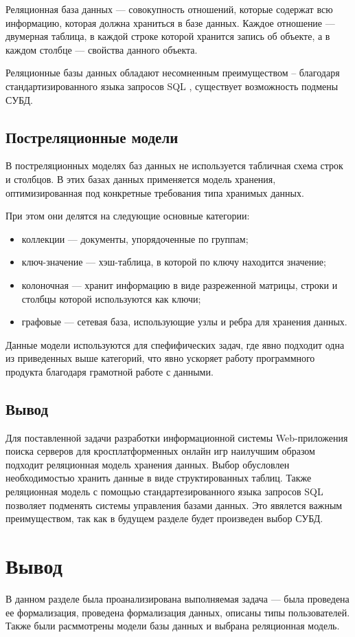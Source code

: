 Реляционная база данных \cite{db-sql} --- совокупность отношений, которые содержат всю информацию, которая должна храниться в базе данных. Каждое отношение --- двумерная таблица, в каждой строке которой хранится запись об объекте, а в каждом столбце --- свойства данного объекта.

Реляционные базы данных обладают несомненным преимуществом -- благодаря стандартизированного языка запросов SQL \cite{sql}, существует возможность подмены СУБД.


\subsection{Постреляционные модели}

В постреляционных моделях баз данных \cite{db-nosql} не используется табличная схема строк и столбцов. В этих базах данных применяется модель хранения, оптимизированная под конкретные требования типа хранимых данных.

При этом они делятся на следующие основные категории:

\begin{itemize}
    \item коллекции --- документы, упорядоченные по группам;
    \item ключ-значение --- хэш-таблица, в которой по ключу находится значение;
    \item колоночная --- хранит информацию в виде разреженной матрицы, строки и столбцы которой используются как ключи;
    \item графовые --- сетевая база, использующие узлы и ребра для хранения данных.
\end{itemize}

Данные модели используются для спефифических задач, где явно подходит одна из приведенных выше категорий, что явно ускоряет работу программного продукта благодаря грамотной работе с данными.


\subsection{Вывод}

Для поставленной задачи разработки информационной системы Web-приложения поиска серверов для кросплатформенных онлайн игр наилучшим образом подходит реляционная модель хранения данных. Выбор обусловлен необходимостью хранить данные в виде структированных таблиц. Также реляционная модель с помощью стандартезированного языка запросов SQL позволяет подменять системы управления базами данных. Это явялется важным преимуществом, так как в будущем разделе будет произведен выбор СУБД.


\section*{Вывод}

В данном разделе была проанализирована выполняемая задача --- была проведена ее формализация, проведена формализация данных, описаны типы пользователей. Также были расммотрены модели базы данных и выбрана реляционная модель.
